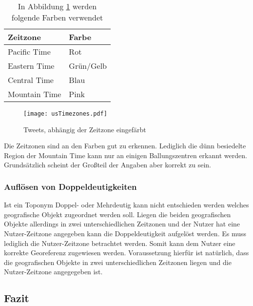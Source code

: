 				\begin{table}[h]
				\centering
				\caption{In Abbildung \ref{img:usTimezones} werden folgende Farben verwendet}
				\label{tab:timezoneColors}
					\begin{tabular}{|l|l|}
						\hline
						Zeitzone      & Farbe     \\ \hline \hline
						Pacific Time  & Rot       \\ \hline
						Eastern Time  & Grün/Gelb \\ \hline
						Central Time  & Blau      \\ \hline
						Mountain Time & Pink      \\ \hline
					\end{tabular}
				\end{table}

				 \begin{figure}[!ht]
					\begin{center}
						\texttt{[image: usTimezones.pdf]}
						\caption{Tweets, abhängig der Zeitzone eingefärbt}
						\label{img:usTimezones}
					\end{center}
				\end{figure}	

				 Die Zeitzonen sind an den Farben gut zu erkennen. 
				 Lediglich die dünn besiedelte Region der Mountain Time kann nur an einigen Ballungszentren erkannt werden. 
				 Grundsätzlich scheint der Großteil der Angaben aber korrekt zu sein.

			\subsubsection{Auflösen von Doppeldeutigkeiten}

				Ist ein Toponym Doppel- oder Mehrdeutig kann nicht entschieden werden welches geografische Objekt zugeordnet werden soll.
				Liegen die beiden geografischen Objekte allerdings in zwei unterschiedlichen Zeitzonen und der Nutzer hat eine Nutzer-Zeitzone angegeben kann die Doppeldeutigkeit aufgelöst werden.
				Es muss lediglich die Nutzer-Zeitzone betrachtet werden.
				Somit kann dem Nutzer eine korrekte Georeferenz zugewiesen werden.
				Voraussetzung hierfür ist natürlich, dass die geografischen Objekte in zwei unterschiedlichen Zeitzonen liegen und die Nutzer-Zeitzone angegegeben ist.

		\subsection{Fazit} 

